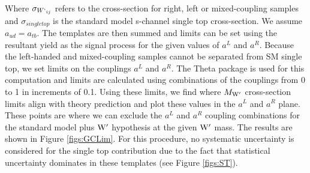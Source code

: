 Where $\sigma_{W`_{ij}}$ refers to the cross-section for right, left or mixed-coupling samples and $\sigma_{single top}$ is the 
standard model s-channel single top cross-section.
We assume $a_{ud} = a_{tb}$.  The templates are then summed and limits can be set 
using the resultant yield as the signal process for the given values of $a^L$ and $a^R$.
Because the left-handed and mixed-coupling samples cannot be separated from SM single top, we set limits on the couplings $a^L$ and $a^R$.
The Theta package is used for this computation and limits are calculated using combinations of the couplings from 0 to 1 in increments of 0.1.  Using these limits, we find where 
$M_{\mathrm{W}^\prime}$ cross-section limits align with theory prediction and plot these values in the $a^L$ and $a^R$ plane.  These points are where we can exclude the $a^L$ and $a^R$ coupling combinations 
for the standard model plus $\mathrm{W}^\prime$ hypothesis at the given $\mathrm{W}^\prime$ mass.  The results are shown in Figure \ref{figs:GCLim}.  For this procedure, no systematic uncertainty is considered for the single top contribution 
due to the fact that statistical uncertainty dominates in these templates (see Figure \ref{figs:ST}).  



